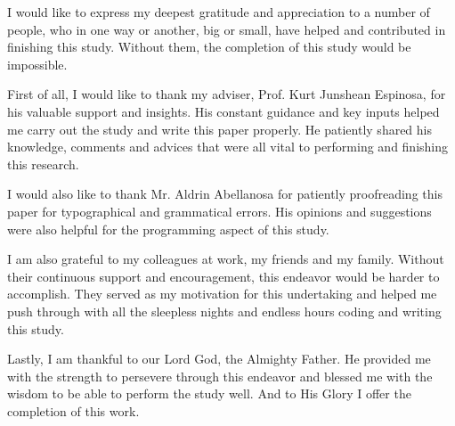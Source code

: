 \begin{acknowledgements}
I would like to express my deepest gratitude and appreciation to a number of
people, who in one way or another, big or small, have helped and contributed in
finishing this study. Without them, the completion of this study would be
impossible.

First of all, I would like to thank my adviser, Prof. Kurt Junshean Espinosa,
for his valuable support and insights. His constant guidance and key inputs
helped me carry out the study and write this paper properly. He patiently
shared his knowledge, comments and advices that were all vital to performing and
finishing this research.

I would also like to thank Mr. Aldrin Abellanosa for patiently proofreading this
paper for typographical and grammatical errors. His opinions and suggestions
were also helpful for the programming aspect of this study.

I am also grateful to my colleagues at work, my friends and my family. Without
their continuous support and encouragement, this endeavor would be harder to accomplish.
They served as my motivation for this undertaking and helped me push through
with all the sleepless nights and endless hours coding and writing this study.

Lastly, I am thankful to our Lord God, the Almighty Father. He provided me with
the strength to persevere through this endeavor and blessed me with the wisdom
to be able to perform the study well. And to His Glory I offer the completion
of this work.

\end{acknowledgements}
